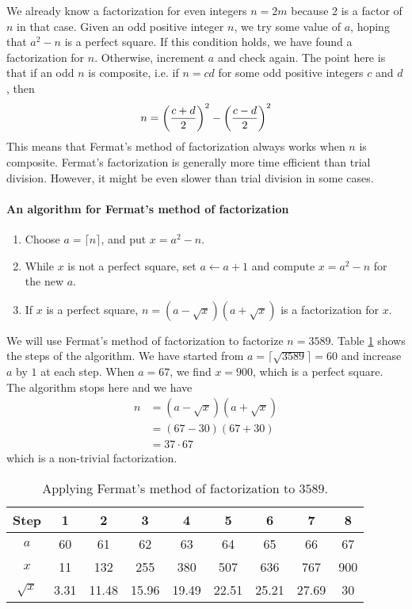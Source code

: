 \documentclass{subfiles}
\begin{document}
	We already know a factorization for even integers $n=2m$ because $2$ is a factor of $n$ in that case. Given an odd positive integer $n$, we try some value of $a$, hoping that $a^2-n$ is a perfect square. If this condition holds, we have found a factorization for $n$. Otherwise, increment $a$ and check again. The point here is that if an odd $n$ is composite, i.e. if $n=cd$ for some odd positive integers $c$ and $d$, then
		\begin{align*}
			n = \func{}{\frac{c+d}{2}}^2 - \func{}{\frac{c-d}{2}}^2
		\end{align*}
	This means that Fermat's method of factorization always works when $n$ is composite. Fermat's factorization is generally more time efficient than trial division. However, it might be even slower than trial division in some cases.
	\paragraph{An algorithm for Fermat's method of factorization}
		\begin{enumerate}[1.]
			\item Choose $a=\lceil n \rceil$, and put $x=a^2-n$.
			\item While $x$ is not a perfect square, set $a \longleftarrow a+1$ and compute $x=a^2-n$ for the new $a$.
			\item If $x$ is a perfect square, $n=(a-\sqrt x)(a+\sqrt x)$ is a factorization for $x$.
		\end{enumerate}

	\begin{example}
		We will use Fermat's method of factorization to factorize $n=3589$. Table \ref{table:fermat} shows the steps of the algorithm. We have started from $a=\lceil\sqrt{3589} \rceil=60$ and increase $a$ by $1$ at each step. When $a=67$, we find $x=900$, which is a perfect square. The algorithm stops here and we have
			\begin{align*}
				n &= (a-\sqrt x)(a+\sqrt x)\\
				  &= (67-30)(67+30)\\
				  &= 37 \cdot 67
			\end{align*}
		which is a non-trivial factorization.
			\begin{table}
				\centering
				\begin{tabular}{|c|c|c|c|c|c|c|c| c|}
					\hline
					Step & 1 & 2 & 3 & 4 & 5 & 6 & 7 & 8 \\
					\hline
					$a$ & 60 & 61 & 62 & 63 & 64 & 65 & 66 & 67 \\
					\hline
					$x$ & 11 & 132 & 255 & 380 & 507 & 636 & 767 & 900 \\
					\hline
					$\sqrt x$ & 3.31 & 11.48 & 15.96 & 19.49 & 22.51 & 25.21 & 27.69 & 30 \\
					\hline
				\end{tabular}
				\caption{Applying Fermat's method of factorization to $3589$.}
				\label{table:fermat}
			\end{table}
	\end{example}
\end{document}
